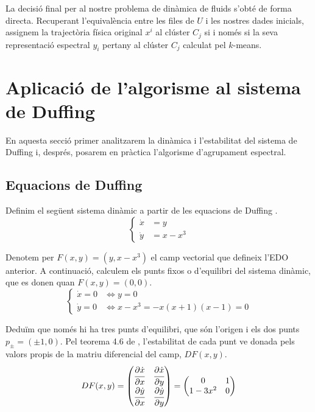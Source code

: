 \documentclass[12,twoside]{TFG-GM}
\theoremstyle{definition}
\theoremstyle{remark}
\begin{document}
La decisió final per al nostre problema de dinàmica de fluids s'obté de forma directa. Recuperant l'equivalència entre les files de $U$ i les nostres dades inicials, assignem la trajectòria física original $x^i$ al clúster $C_j$ si i només si la seva representació espectral $y_i$ pertany al clúster $C_j$ calculat pel $k$-means.




\section{Aplicació de l'algorisme al sistema de Duffing}\label{section:aplicacio}

En aquesta secció primer analitzarem la dinàmica i l'estabilitat del sistema de Duffing i, després, posarem en pràctica l'algorisme d'agrupament espectral.

\subsection{Equacions de Duffing}

Definim el següent sistema dinàmic a partir de les equacions de Duffing \cite{Jezabel2018}.
\begin{equation}
    \label{eq:pvi}
    \left\{
    \begin{aligned}
        \dot{x} &= y \\
        \dot{y} &= x - x^3 
    \end{aligned}
    \right.
\end{equation}

Denotem per $F(x,y)=(y,x-x^3)$ el camp vectorial que defineix l'EDO anterior.
A continuació, calculem els punts fixos o d'equilibri del sistema dinàmic, que es donen quan $F(x,y)=(0,0)$.
\begin{equation}
    \left\{
    \begin{aligned}
        \dot{x}=0 &\iff y=0\\
        \dot{y}=0 &\iff x-x^3=-x(x+1)(x-1)=0
    \end{aligned}
    \right.
\end{equation}

Deduïm que només hi ha tres punts d'equilibri, que són l'origen i els dos punts $p_\pm=(\pm1,0)$.
Pel teorema 4.6 de \cite{Meiss2007}, l'estabilitat de cada punt ve donada pels valors propis de la matriu diferencial del camp, $DF(x,y)$.
\begin{equation}
    DF(x,y) = 
\begin{pmatrix}
\cfrac{\partial \dot{x}}{\partial x} & \cfrac{\partial \dot{x}}{\partial y} \\
\cfrac{\partial \dot{y}}{\partial x} & \cfrac{\partial \dot{y}}{\partial y}
\end{pmatrix}
= 
\begin{pmatrix}
0 & 1 \\
1 - 3x^2 & 0
\end{pmatrix}
\end{equation}
\end{document}

